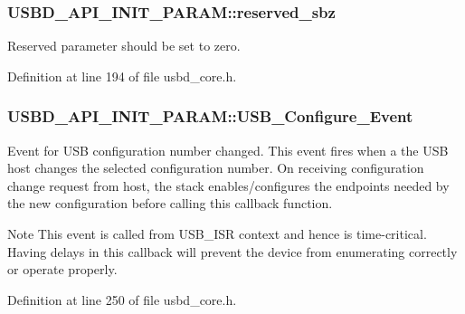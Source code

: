 \subsubsection[{\texorpdfstring{reserved\+\_\+sbz}{reserved_sbz}}]{ U\+S\+B\+D\+\_\+\+A\+P\+I\+\_\+\+I\+N\+I\+T\+\_\+\+P\+A\+R\+A\+M\+::reserved\+\_\+sbz}\hypertarget{structUSBD__API__INIT__PARAM_a8470d3c0f29b31408ffa46dd4a4bd74a}{}\label{structUSBD__API__INIT__PARAM_a8470d3c0f29b31408ffa46dd4a4bd74a}
Reserved parameter should be set to zero. 

Definition at line 194 of file usbd\+\_\+core.\+h.

\subsubsection[{\texorpdfstring{U\+S\+B\+\_\+\+Configure\+\_\+\+Event}{USB_Configure_Event}}]{ U\+S\+B\+D\+\_\+\+A\+P\+I\+\_\+\+I\+N\+I\+T\+\_\+\+P\+A\+R\+A\+M\+::\+U\+S\+B\+\_\+\+Configure\+\_\+\+Event}\hypertarget{structUSBD__API__INIT__PARAM_ac78477c763bc96613ad5069c84ae3563}{}\label{structUSBD__API__INIT__PARAM_ac78477c763bc96613ad5069c84ae3563}
Event for U\+SB configuration number changed. This event fires when a the U\+SB host changes the selected configuration number. On receiving configuration change request from host, the stack enables/configures the endpoints needed by the new configuration before calling this callback function. ~\newline
 \begin{DoxyNote}{Note}
This event is called from U\+S\+B\+\_\+\+I\+SR context and hence is time-\/critical. Having delays in this callback will prevent the device from enumerating correctly or operate properly. 
\end{DoxyNote}


Definition at line 250 of file usbd\+\_\+core.\+h.

